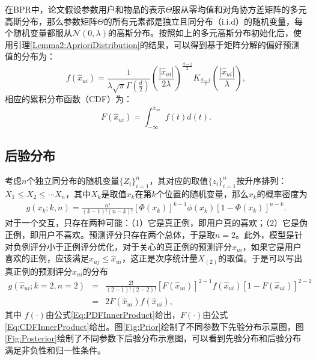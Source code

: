 在BPR中，论文假设参数用户和物品的表示$\Theta$服从零均值和对角协方差矩阵的多元高斯分布，那么参数矩阵$\Theta$的所有元素都是独立且同分布（i.i.d）的随机变量，每个随机变量都服从$\mathcal{N}(0, \lambda)$的高斯分布。按照如上的多元高斯分布初始化后，使用引理\ref{Lemma2:AprioriDistribution}的结果，可以得到基于矩阵分解的偏好预测值的分布为：
\begin{equation}\label{Eq:PDFInnerProduct}
	f(\hat{x}_{ui}) = \frac{1}{\lambda \sqrt{\pi} \Gamma(\frac{d}{2})}\left(\frac{|\hat{x}_{ui}|}{2\lambda} \right)^{\frac{d-1}{2}}K_{\frac{d-1}{2}}\left(\frac{|\hat{x}_{ui}|}{\lambda}\right),
\end{equation}
相应的累积分布函数（CDF）为：
\begin{equation}\label{Eq:CDFInnerProduct}
	F(\hat{x}_{ui}) = \int_{-\infty}^{\hat{x}_{ui}} f(t)d(t).
\end{equation}

\subsection{后验分布}\label{Sec:Posterior}
考虑$n$个独立同分布的随机变量$\{Z_i\}_{i=1}^n$，其对应的取值$\{z_i\}_{i=1}^n$按升序排列：$X_1 \le X_2 \le \cdots X_n$，其中$X_k$是取值$x_k$在第$k$个位置的随机变量，那么$x_k$的概率密度为
\begin{equation}\label{Eq:PosteriorPDF}
	\begin{aligned}
		g({x_k};k,n)
		=   \frac{{n!}}{{(k - 1)!(n - k)!}} {[\Phi({x_k})]^{k - 1}}\phi({x_k}){[1 - \Phi({x_k})]^{n - k}}.
	\end{aligned}
\end{equation}
对于一个交互，只存在两种可能：（1）它是真正例，即用户真的喜欢；（2）它是伪正例，即用户不喜欢。预测评分只存在两个总体，于是取$n=2$。此外，模型是针对负例评分小于正例评分优化，对于关心的真正例的预测评分$\hat{x}_{ui}$，如果它是用户喜欢的正例，应该满足$\hat{x}_{uj}\leq \hat{x}_{ui}$，这正是次序统计量$X_{(2)}$的取值。于是可以写出真正例的预测评分$\hat{x}_{ui}$的分布
\begin{eqnarray}\label{Eq:ConditionalDistribution}
	g(\hat{x}_{ui};k=2,n=2)
	& = & \frac{2!}{(2-1)!(2-2)!}[F(\hat{x}_{ui})]^{2-1} f(\hat{x}_{ui}) [1 - F(\hat{x}_{ui})]^{2-2} \nonumber \\
	& = & 2 F(\hat{x}_{ui})f(\hat{x}_{ui}),
\end{eqnarray}
其中 $f(\cdot)$由公式\ref{Eq:PDFInnerProduct}给出，$F(\cdot)$由公式\ref{Eq:CDFInnerProduct}给出。图\ref{Fig:Prior}绘制了不同参数下先验分布示意图，图\ref{Fig:Posterior}绘制了不同参数下后验分布示意图，可以看到先验分布和后验分布满足非负性和归一性条件。
\begin{figure*}[t]
	\centering
	\caption{不同参数下先验分布示意图}
	\label{Fig:Prior}
\end{figure*}

